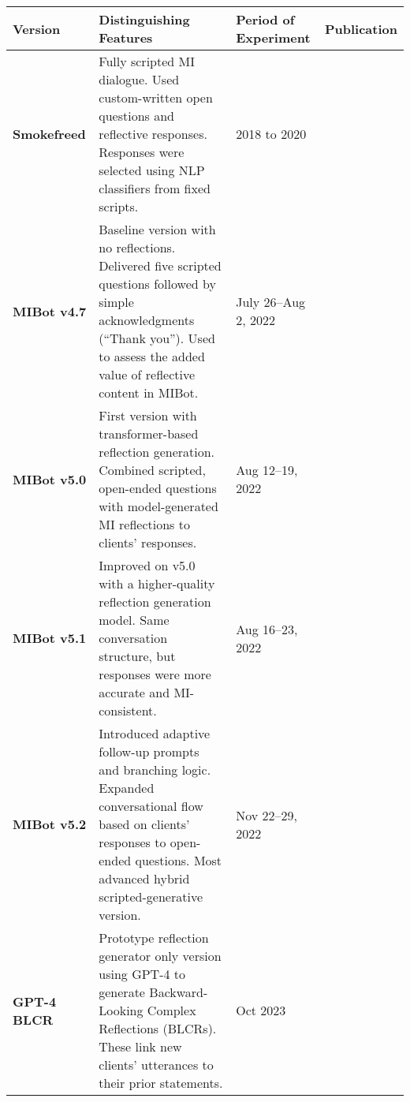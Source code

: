 \begin{table}[!h]
	\small
	\centering
	\begin{tabular}{
		@{}m{}
		m{}
		m{}
		m{}@{}}
		\toprule
		\textbf{Version}     & \textbf{Distinguishing Features}                                                                                                                                                               & \textbf{Period of Experiment}   & \textbf{Publication}     \\
		\midrule
		\arrayrulecolor{gray!50}
		\textbf{Smokefreed}  & Fully scripted MI dialogue. Used custom-written open ques\-tions and reflective responses. Responses were selected using NLP classifiers from fixed scripts.                                     & 2018 to 2020                    & \citet{Almusharraf_2019} \\
		\hline
		\textbf{MIBot v4.7}  & Baseline version with no reflections. Delivered five scripted questions followed by simple acknowledgments (“Thank you”). Used to assess the added value of reflective content in MIBot.     & July 26–Aug 2, 2022             & \citet{brown2023mi}      \\
		\hline
		\textbf{MIBot v5.0}  & First version with transformer-based reflection generation. Combined scripted, open-ended questions with model-generated MI reflections to clients' responses.                                 & Aug 12–19, 2022                 & \citet{brown2023mi}      \\
		\hline
		\textbf{MIBot v5.1}  & Improved on v5.0 with a higher-quality reflection generation model. Same conversation structure, but responses were more accurate and MI-consistent.                                           & Aug 16–23, 2022                 & \citet{brown2023mi}      \\
		\hline
		\textbf{MIBot v5.2}  & Introduced adaptive follow-up prompts and branching logic. Expanded conversational flow based on clients' responses to open-ended questions. Most advanced hybrid scripted-generative version. & Nov 22–29, 2022                 & \citet{brown2023mi}      \\
		\hline
		\textbf{GPT-4 BLCR}  & Prototype reflection generator only version using GPT-4 to generate Backward-Looking Complex Reflections (BLCRs). These link new clients' utterances to their prior statements.
		                     & Oct 2023
		                     & \citet{brown2023mi}                                                                                                                                                                                                                                         \\

\end{tabular}
\end{table}
